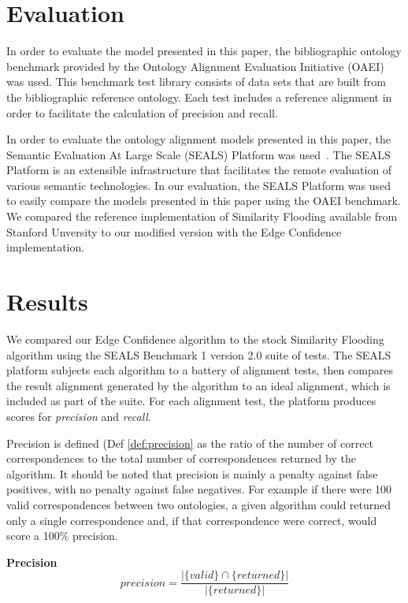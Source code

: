 \documentclass[letterpaper,twocolumn,12pt]{article}
\begin{document}
\section{Evaluation}
\label{sec:eval}

In order to evaluate the model presented in this paper, the bibliographic ontology benchmark provided by 
the Ontology Alignment Evaluation Initiative (OAEI) was used.
This benchmark test library consists of data sets that are built from the bibliographic reference ontology.
Each test includes a reference alignment in order to facilitate the calculation of precision and recall.

In order to evaluate the ontology alignment models presented in this paper, the Semantic Evaluation 
At Large Scale (SEALS) Platform was used~\cite{esteban:2010:executing, wrigley:2010:evaluating}.
The SEALS Platform is an extensible infrastructure that facilitates the remote evaluation of various semantic technologies.
In our evaluation, the SEALS Platform was used to easily compare the models presented in this paper using the OAEI benchmark.
We compared the reference implementation of Similarity Flooding available from Stanford Unversity
to our modified version with the Edge Confidence implementation.


\section{Results}
\label{sec:results}
We compared our Edge Confidence algorithm to the stock Similarity Flooding algorithm using the SEALS Benchmark 1 version 2.0 suite of tests. 
The SEALS platform subjects each algorithm to a battery of alignment tests, then compares the result alignment generated by the algorithm to an ideal alignment, which is included as part of the suite.
For each alignment test, the platform produces scores for \textit{precision} and \textit{recall}.

Precision is defined (Def \ref{def:precision} as the ratio of the number of correct correspondences to the total number of correspondences returned by the algorithm. It should be noted that precision is mainly a penalty against false positives, with no penalty against false negatives. 
For example if there were 100 valid correspondences between two ontologies, a given algorithm could returned only a single correspondence and, if that correspondence were correct, would score a 100\% precision. 

\begin{defn}
\textbf{Precision}
\label{def:precision}
$$
	precision = \frac{|\{valid \} \cap  \{returned \}|}{|\{returned \}|}
$$
\end{defn}
\end{document}
